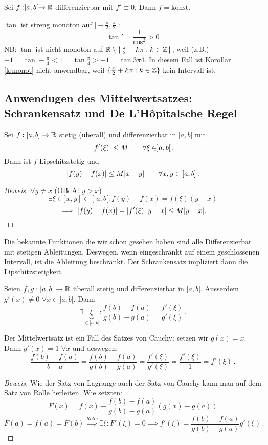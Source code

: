 \begin{Kor}
  Sei $f: ]a,b[\to \mathbb{R}$ differenzierbar mit $f'\equiv 0$. Dann $f=\text{konst}$.
\end{Kor}
\begin{Bsp}\label{b:tan_in}
  $\tan$ ist streng monoton auf $]-\frac{\pi}{2},\frac{\pi}{2}[$:
  \[\tan'=\frac{1}{\cos^2}>0\]
NB: $\tan$ ist nicht monoton auf 
$\mathbb{R}\setminus\left\{ \frac{\pi}{2}+k\pi:k\in\mathbb{Z} \right\}$,
weil (z.B.) $-1 = \tan -\frac{\pi}{4} < 1= \tan \frac{\pi}{4}
> -1 = \tan{3\pi}{4}$. In diesem Fall ist Korollar \ref{k:monot}
nicht anwendbar, weil $\{\frac{\pi}{2}+k\pi:k\in\mathbb{Z}\}$ kein Intervall ist.
\end{Bsp}
\subsection{Anwendugen des Mittelwertsatzes: Schrankensatz und De L'Hôpitalsche Regel}
\begin{Sat}[Schrankensatz]
  Sei $f:[a,b]\to\mathbb{R}$ stetig (überall) und differenzierbar in $]a,b[$ mit
  \[\mathopen| f'(\xi) \mathclose|\leq M\qquad\forall \xi\in ]a,b[\, .\]
  Dann ist $f$ Lipschitzstetig und
  \[\mathopen| f(y)-f(x) \mathclose|\leq M\mathopen| x-y \mathclose|\qquad\forall x,y\in [a,b]\, .\]
\end{Sat}
\begin{proof}[Beweis]
  $\forall y\neq x$ (OBdA: $y>x$)
  \[\exists \xi\in ]x,y[\subset ]a,b[: f(y)-f(x)=f(\xi)(y-x)\]
  \[\implies \mathopen| f(y)-f(x) \mathclose|=\mathopen| f'(\xi) \mathclose|\mathopen| y-x \mathclose|\leq M\mathopen| y-x \mathclose|.\]
\end{proof}

Die bekannte Funktionen die wir schon gesehen haben sind alle
Differenzierbar mit stetigen Ableitungen. Deswegen, wenn eingeschr\"ankt auf
einem geschlossenen Intervall, ist die Ableitung beschr\"ankt. Der Schrankensatz
impliziert dann die Lipschitzstetigkeit.

\begin{Sat}[Cauchy]
  Seien $f,g:[a,b]\to\mathbb{R}$ überall stetig und differenzierbar in $]a,b[$. Ausserdem $g'(x)\neq 0$ $\forall x\in ]a,b[$. Dann
  \[\exists \underbrace{\xi}_{\in ]a,b[}:\frac{f(b)-f(a)}{g(b)-g(a)}=\frac{f'(\xi)}{g'(\xi)}\, .\]
\end{Sat}
\begin{Bem} Der Mittelwertsatz ist ein Fall des Satzes von Cauchy: setzen wir
$g(x)=x$. Dann $g' (x)=1$ $\forall x$ und deswegen:
\[
\frac{f(b)-f(a)}{b-a} = \frac{f(b)-f(a)}{g(b)-g(a)}
= \frac{f'(\xi)}{g'(\xi)} = \frac{f'(\xi)}{1} = f'(\xi)\, .
\]
\end{Bem}
\begin{proof}[Beweis] Wie der Satz von Lagrange auch der 
Satz von Cauchy kann man auf dem Satz von Rolle herleiten. 
Wie setzten: 
  \[F(x)=f(x)-\frac{f(b)-f(a)}{g(b)-g(a)}(g(x)-g(a))\]
  \[F(a)=f(a)=F(b)\stackrel{Rolle}{\implies} 
\exists \xi: F'(\xi)=0\implies f'(\xi) = \frac{f(b)-f(a)}{g(b)-g(a)}g'(\xi)\, .\]
\end{proof}
